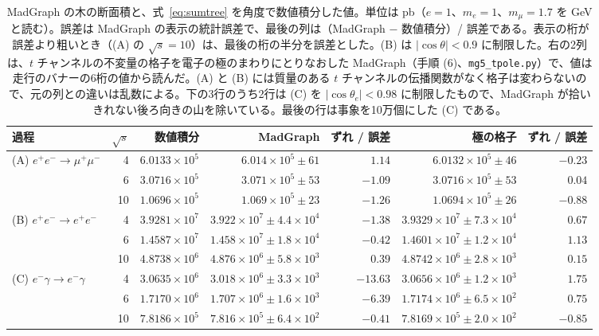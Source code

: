 \documentclass[a4paper,10pt]{ltjsarticle}
\begin{document}
\begin{table}[tbp]
\centering\small
\caption{MadGraph の木の断面積と、式~\eqref{eq:sumtree} を角度で数値積分した値。単位は pb（$e=1$、$m_e=1$、$m_\mu=1.7$ を GeV と読む）。誤差は MadGraph の表示の統計誤差で、最後の列は（MadGraph $-$ 数値積分）/ 誤差である。表示の桁が誤差より粗いとき（(A) の $\sqrt s=10$）は、最後の桁の半分を誤差とした。(B) は $|\cos\theta|<0.9$ に制限した。右の2列は、$t$ チャンネルの不変量の格子を電子の極のまわりにとりなおした MadGraph（手順 (6)、\texttt{mg5\_tpole.py}）で、値は走行のバナーの6桁の値から読んだ。(A) と (B) には質量のある $t$ チャンネルの伝播関数がなく格子は変わらないので、元の列との違いは乱数による。下の3行のうち2行は (C) を $|\cos\theta_e|<0.98$ に制限したもので、MadGraph が拾いきれない後ろ向きの山を除いている。最後の行は事象を10万個にした (C) である。}
\label{tab:tree}
\footnotesize\setlength{\tabcolsep}{4pt}
\begin{tabular}{lrrrrrr}
\toprule
過程 & $\sqrt s$ & 数値積分 & MadGraph & ずれ / 誤差 & 極の格子 & ずれ / 誤差 \\
\midrule
(A) $e^+e^-\to\mu^+\mu^-$ & 4 & $6.0133\times10^{5}$ & $6.014\times10^{5}\pm61$ & $1.14$ & $6.0132\times10^{5}\pm46$ & $-0.23$ \\
 & 6 & $3.0716\times10^{5}$ & $3.071\times10^{5}\pm53$ & $-1.09$ & $3.0716\times10^{5}\pm53$ & $0.04$ \\
 & 10 & $1.0696\times10^{5}$ & $1.069\times10^{5}\pm23$ & $-1.26$ & $1.0694\times10^{5}\pm26$ & $-0.88$ \\
(B) $e^+e^-\to e^+e^-$ & 4 & $3.9281\times10^{7}$ & $3.922\times10^{7}\pm4.4\times10^{4}$ & $-1.38$ & $3.9329\times10^{7}\pm7.3\times10^{4}$ & $0.67$ \\
 & 6 & $1.4587\times10^{7}$ & $1.458\times10^{7}\pm1.8\times10^{4}$ & $-0.42$ & $1.4601\times10^{7}\pm1.2\times10^{4}$ & $1.13$ \\
 & 10 & $4.8738\times10^{6}$ & $4.876\times10^{6}\pm5.8\times10^{3}$ & $0.39$ & $4.8742\times10^{6}\pm2.8\times10^{3}$ & $0.15$ \\
(C) $e^-\gamma\to e^-\gamma$ & 4 & $3.0635\times10^{6}$ & $3.018\times10^{6}\pm3.3\times10^{3}$ & $\mathbf{-13.63}$ & $3.0656\times10^{6}\pm1.2\times10^{3}$ & $1.75$ \\
 & 6 & $1.7170\times10^{6}$ & $1.707\times10^{6}\pm1.6\times10^{3}$ & $\mathbf{-6.39}$ & $1.7174\times10^{6}\pm6.5\times10^{2}$ & $0.75$ \\
 & 10 & $7.8186\times10^{5}$ & $7.816\times10^{5}\pm6.4\times10^{2}$ & $-0.41$ & $7.8169\times10^{5}\pm2.0\times10^{2}$ & $-0.85$ \\

\end{tabular}
\end{table}
\end{document}
